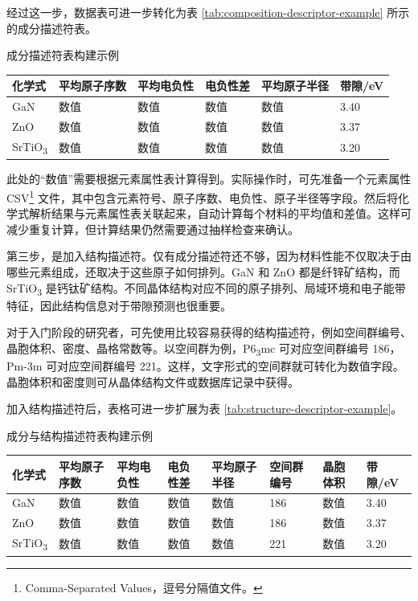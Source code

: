 经过这一步，数据表可进一步转化为表 \ref{tab:composition-descriptor-example} 所示的成分描述符表。


\begin{formalTable}[htbp]
\caption{成分描述符表构建示例}
\label{tab:composition-descriptor-example}
\footnotesize
\setlength{\tabcolsep}{2.8pt}
\begin{tabularx}{\textwidth}{@{}YYYYYY@{}}
\toprule
\textbf{化学式} & \textbf{平均原子序数} & \textbf{平均电负性} & \textbf{电负性差} & \textbf{平均原子半径} & \textbf{带隙/eV} \\
\midrule
GaN & 数值 & 数值 & 数值 & 数值 & 3.40 \\
ZnO & 数值 & 数值 & 数值 & 数值 & 3.37 \\
SrTiO\textsubscript{3} & 数值 & 数值 & 数值 & 数值 & 3.20 \\
\bottomrule
\end{tabularx}
\end{formalTable}

此处的“数值”需要根据元素属性表计算得到。实际操作时，可先准备一个元素属性 CSV\footnote{Comma-Separated Values，逗号分隔值文件。} 文件，其中包含元素符号、原子序数、电负性、原子半径等字段。然后将化学式解析结果与元素属性表关联起来，自动计算每个材料的平均值和差值。这样可减少重复计算，但计算结果仍然需要通过抽样检查来确认。


第三步，是加入结构描述符。仅有成分描述符还不够，因为材料性能不仅取决于由哪些元素组成，还取决于这些原子如何排列。GaN 和 ZnO 都是纤锌矿结构，而 SrTiO\textsubscript{3} 是钙钛矿结构。不同晶体结构对应不同的原子排列、局域环境和电子能带特征，因此结构信息对于带隙预测也很重要。


对于入门阶段的研究者，可先使用比较容易获得的结构描述符，例如空间群编号、晶胞体积、密度、晶格常数等。以空间群为例，P6\textsubscript{3}mc 可对应空间群编号 186，Pm-3m 可对应空间群编号 221。这样，文字形式的空间群就可转化为数值字段。晶胞体积和密度则可从晶体结构文件或数据库记录中获得。


加入结构描述符后，表格可进一步扩展为表 \ref{tab:structure-descriptor-example}。


\begin{formalTable}[htbp]
\caption{成分与结构描述符表构建示例}
\label{tab:structure-descriptor-example}
\scriptsize
\setlength{\tabcolsep}{2.8pt}
\begin{tabularx}{\textwidth}{@{}YYYYYYYY@{}}
\toprule
\textbf{化学式} & \textbf{平均原子序数} & \textbf{平均电负性} & \textbf{电负性差} & \textbf{平均原子半径} & \textbf{空间群编号} & \textbf{晶胞体积} & \textbf{带隙/eV} \\
\midrule
GaN & 数值 & 数值 & 数值 & 数值 & 186 & 数值 & 3.40 \\
ZnO & 数值 & 数值 & 数值 & 数值 & 186 & 数值 & 3.37 \\
SrTiO\textsubscript{3} & 数值 & 数值 & 数值 & 数值 & 221 & 数值 & 3.20 \\
\bottomrule
\end{tabularx}
\end{formalTable}

